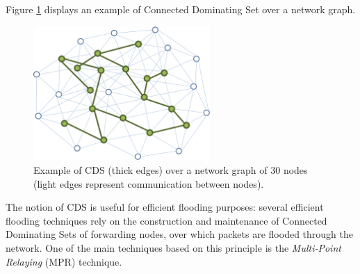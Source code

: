 
Figure \ref{f:ex_cds} displays an example of Connected Dominating Set over a network graph.

\begin{figure}[htb]	%
\centering
\includegraphics[width=0.6\textwidth]{Figures/excds-crop.pdf} %
\caption{Example of CDS (thick edges) over a network graph of 30 nodes (light edges represent communication between nodes).}
\label{f:ex_cds}
\end{figure}

The notion of CDS is useful for efficient flooding purposes: several efficient flooding techniques rely on the construction and maintenance of Connected Dominating Sets of forwarding nodes, over which packets are flooded through the network. One of the main techniques based on this principle is the {\em Multi-Point Relaying} (MPR) technique.

